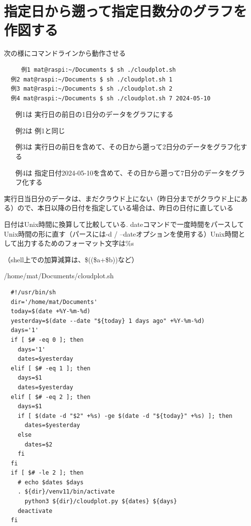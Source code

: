 \documentclass[12pt,a4j]{jsbook}
\begin{document}
\section{指定日から遡って指定日数分のグラフを作図する}

次の様にコマンドラインから動作させる

\begin{spacing}{0.95}
\begin{screen}
\begin{verbatim}
	 例1 mat@raspi:~/Documents $ sh ./cloudplot.sh
  例2 mat@raspi:~/Documents $ sh ./cloudplot.sh 1
  例3 mat@raspi:~/Documents $ sh ./cloudplot.sh 2
  例4 mat@raspi:~/Documents $ sh ./cloudplot.sh 7 2024-05-10
\end{verbatim}
\end{screen}
\end{spacing}

\begin{itemize}
\item[例1は] 実行日の前日の1日分のデータをグラフにする
\item[例2は] 例1と同じ
\item[例3は] 実行日の前日を含めて、その日から遡って2日分のデータをグラフ化する
\item[例4は] 指定日付2024-05-10を含めて、その日から遡って7日分のデータをグラフ化する
\end{itemize}

実行日当日分のデータは、まだクラウド上にない（昨日分までがクラウド上にある）ので、本日以降の日付を指定している場合は、昨日の日付に直している

日付はUnix時間に換算して比較している.
dateコマンドで一度時間をパースしてUnix時間の形に直す（パースには-d / --dateオプションを使用する）Unix時間として出力するためのフォーマット文字は\%s

（shell上での加算減算は、\$((\$a+\$b))など）

\begin{spacing}{0.95}
\begin{itembox}[l]{/home/mat/Documents/cloudplot.sh}
\begin{verbatim}
  #!/usr/bin/sh
  dir='/home/mat/Documents'
  today=$(date +%Y-%m-%d)
  yesterday=$(date --date "${today} 1 days ago" +%Y-%m-%d)
  days='1'
  if [ $# -eq 0 ]; then
    days='1'
    dates=$yesterday
  elif [ $# -eq 1 ]; then
    days=$1
    dates=$yesterday
  elif [ $# -eq 2 ]; then
    days=$1
    if [ $(date -d "$2" +%s) -ge $(date -d "${today}" +%s) ]; then
      dates=$yesterday
    else
      dates=$2
    fi
  fi
  if [ $# -le 2 ]; then
    # echo $dates $days
    . ${dir}/venv11/bin/activate
      python3 ${dir}/cloudplot.py ${dates} ${days}
    deactivate
  fi
\end{verbatim}
\end{itembox}
\end{spacing}
\end{document}
